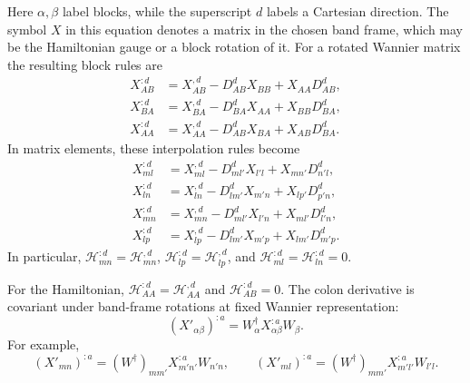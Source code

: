 \documentclass[prx,amsmath,amssymb,superscriptaddress,longbibliography]{revtex4-2}
\begin{document}
Here $\alpha,\beta$ label blocks, while the superscript $d$ labels a Cartesian direction.
The symbol $X$ in this equation denotes a matrix in the chosen band frame,
which may be the Hamiltonian gauge or a block rotation of it.
For a rotated Wannier matrix the resulting block rules are
\begin{align}
 X_{AB}^{:d}&=X_{AB}^{,d}-D_{AB}^dX_{BB}+X_{AA}D_{AB}^d,\label{eq:block-ab}\\
 X_{BA}^{:d}&=X_{BA}^{,d}-D_{BA}^dX_{AA}+X_{BB}D_{BA}^d,\\
 X_{AA}^{:d}&=X_{AA}^{,d}-D_{AB}^dX_{BA}+X_{AB}D_{BA}^d.
 \label{eq:block-aa}
\end{align}
In matrix elements, these interpolation rules become
\begin{align}
 X_{ml}^{:d}&=X_{ml}^{,d}-D_{ml'}^dX_{l'l}+X_{mn'}D_{n'l}^d,\nonumber\\
 X_{ln}^{:d}&=X_{ln}^{,d}-D_{lm'}^dX_{m'n}+X_{lp'}D_{p'n}^d,\nonumber\\
 X_{mn}^{:d}&=X_{mn}^{,d}-D_{ml'}^dX_{l'n}+X_{ml'}D_{l'n}^d,\nonumber\\
 X_{lp}^{:d}&=X_{lp}^{,d}-D_{lm'}^dX_{m'p}+X_{lm'}D_{m'p}^d.
 \label{eq:interpolation-derivative-components}
\end{align}
In particular, $\mathcal H_{mn}^{:d}=\mathcal H_{mn}^{,d}$,
$\mathcal H_{lp}^{:d}=\mathcal H_{lp}^{,d}$, and
$\mathcal H_{ml}^{:d}=\mathcal H_{ln}^{:d}=0$.

For the Hamiltonian, $\mathcal H_{AA}^{:d}=\mathcal H_{AA}^{,d}$ and
$\mathcal H_{AB}^{:d}=0$.
The colon derivative is covariant under band-frame rotations at fixed
Wannier representation:
\begin{equation}
 (X'_{\alpha\beta})^{:a}=W_\alpha^\dagger X_{\alpha\beta}^{:a}W_\beta.
 \label{eq:colon-transformation}
\end{equation}
For example,
\begin{equation}
 (X'_{mn})^{:a}=(W^\dagger)_{mm'}X_{m'n'}^{:a}W_{n'n},\qquad
 (X'_{ml})^{:a}=(W^\dagger)_{mm'}X_{m'l'}^{:a}W_{l'l}.
 \label{eq:colon-transformation-components}
\end{equation}
\end{document}
